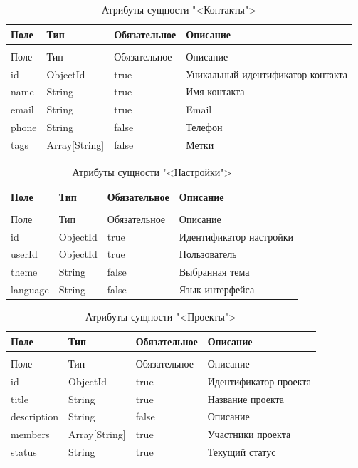 \begin{xltabular}{\textwidth}{|l|l|p{3.2cm}|X|}
  \caption{Атрибуты сущности "<Контакты">\label{contacts:table}}\\ \hline
  Поле & Тип & Обязательное & Описание \\ \hline
  \endfirsthead
  \\ \hline
  Поле & Тип & Обязательное & Описание \\ \hline
  \endhead
  id & ObjectId & true & Уникальный идентификатор контакта \\ \hline
  name & String & true & Имя контакта \\ \hline
  email & String & true & Email \\ \hline
  phone & String & false & Телефон \\ \hline
  tags & Array[String] & false & Метки \\ \hline
\end{xltabular}

\begin{xltabular}{\textwidth}{|l|l|p{3.2cm}|X|}
  \caption{Атрибуты сущности "<Настройки">\label{settings:table}}\\ \hline
  Поле & Тип & Обязательное & Описание \\ \hline
  \endfirsthead
  \\ \hline
  Поле & Тип & Обязательное & Описание \\ \hline
  \endhead
  id & ObjectId & true & Идентификатор настройки \\ \hline
  userId & ObjectId & true & Пользователь \\ \hline
  theme & String & false & Выбранная тема \\ \hline
  language & String & false & Язык интерфейса \\ \hline
\end{xltabular}

\begin{xltabular}{\textwidth}{|l|l|p{3.2cm}|X|}
  \caption{Атрибуты сущности "<Проекты">\label{projects:table}}\\ \hline
  Поле & Тип & Обязательное & Описание \\ \hline
  \endfirsthead
  \\ \hline
  Поле & Тип & Обязательное & Описание \\ \hline
  \endhead
  id & ObjectId & true & Идентификатор проекта \\ \hline
  title & String & true & Название проекта \\ \hline
  description & String & false & Описание \\ \hline
  members & Array[String] & true & Участники проекта \\ \hline
  status & String & true & Текущий статус \\ \hline
\end{xltabular}

